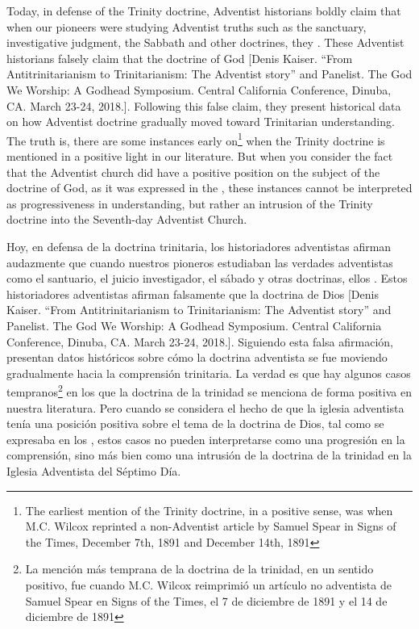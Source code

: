 Today, in defense of the Trinity doctrine, Adventist historians boldly claim that when our pioneers were studying Adventist truths such as the sanctuary, investigative judgment, the Sabbath and other doctrines, they . These Adventist historians falsely claim that the doctrine of God [Denis Kaiser. “From Antitrinitarianism to Trinitarianism: The Adventist story” and Panelist. The God We Worship: A Godhead Symposium. Central California Conference, Dinuba, CA. March 23-24, 2018.]. Following this false claim, they present historical data on how Adventist doctrine gradually moved toward Trinitarian understanding. The truth is, there are some instances early on\footnote{The earliest mention of the Trinity doctrine, in a positive sense, was when M.C. Wilcox reprinted a non-Adventist article by Samuel Spear in Signs of the Times, December 7th, 1891 and December 14th, 1891} when the Trinity doctrine is mentioned in a positive light in our literature. But when you consider the fact that the Adventist church did have a positive position on the subject of the doctrine of God, as it was expressed in the , these instances cannot be interpreted as progressiveness in understanding, but rather an intrusion of the Trinity doctrine into the Seventh-day Adventist Church.


Hoy, en defensa de la doctrina trinitaria, los historiadores adventistas afirman audazmente que cuando nuestros pioneros estudiaban las verdades adventistas como el santuario, el juicio investigador, el sábado y otras doctrinas, ellos . Estos historiadores adventistas afirman falsamente que la doctrina de Dios [Denis Kaiser. “From Antitrinitarianism to Trinitarianism: The Adventist story” and Panelist. The God We Worship: A Godhead Symposium. Central California Conference, Dinuba, CA. March 23-24, 2018.]. Siguiendo esta falsa afirmación, presentan datos históricos sobre cómo la doctrina adventista se fue moviendo gradualmente hacia la comprensión trinitaria. La verdad es que hay algunos casos tempranos\footnote{La mención más temprana de la doctrina de la trinidad, en un sentido positivo, fue cuando M.C. Wilcox reimprimió un artículo no adventista de Samuel Spear en Signs of the Times, el 7 de diciembre de 1891 y el 14 de diciembre de 1891} en los que la doctrina de la trinidad se menciona de forma positiva en nuestra literatura. Pero cuando se considera el hecho de que la iglesia adventista tenía una posición positiva sobre el tema de la doctrina de Dios, tal como se expresaba en los , estos casos no pueden interpretarse como una progresión en la comprensión, sino más bien como una intrusión de la doctrina de la trinidad en la Iglesia Adventista del Séptimo Día.


